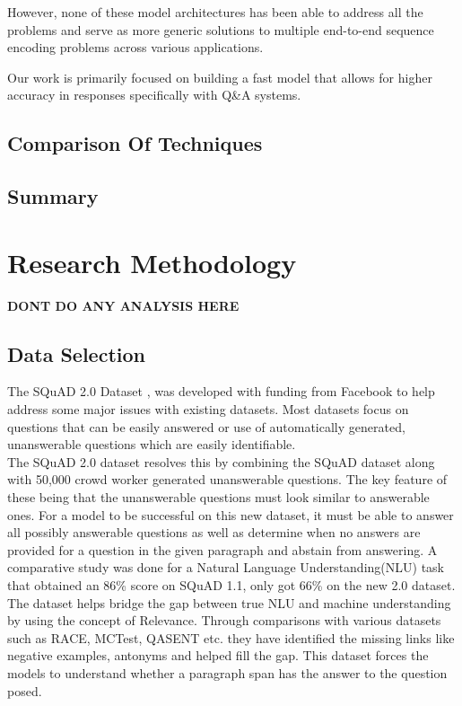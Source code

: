 \documentclass[12pt]{report}
\begin{document}
        However, none of these model architectures has been able to address all the problems and serve as more generic solutions to multiple end-to-end sequence encoding problems across various applications.

        Our work is primarily focused on building a fast model that allows for higher accuracy in responses specifically with Q\&A systems.

        \section{Comparison Of Techniques}\label{24}
        \section{Summary}\label{25}

    \chapter{\centering Research Methodology}\label{c3}
    \textbf{DONT DO ANY ANALYSIS HERE}
        \section{Data Selection}\label{c31}

        The SQuAD 2.0 Dataset \citep{dataset}, was developed with funding from Facebook to help address some major issues with existing datasets. Most datasets focus on questions that can be easily answered or use of automatically generated, unanswerable questions which are easily identifiable.\\
        The SQuAD 2.0 dataset resolves this by combining the SQuAD dataset along with 50,000 crowd worker generated unanswerable questions. The key feature of these being that the unanswerable questions must look similar to answerable ones. For a model to be successful on this new dataset, it must be able to answer all possibly answerable questions as well as determine when no answers are provided for a question in the given paragraph and abstain from answering. A comparative study was done for a Natural Language Understanding(NLU) task that obtained an 86\% score on SQuAD 1.1, only got 66\% on the new 2.0 dataset.
        The dataset helps bridge the gap between true NLU and machine understanding by using the concept of Relevance. Through comparisons with various datasets such as \acrshort{RACE}, \acrshort{MCTest}, \acrshort{QASENT} etc. they have identified the missing links like negative examples, antonyms and helped fill the gap. This dataset forces the models to understand whether a paragraph span has the answer to the question posed.
\end{document}

